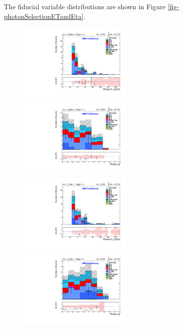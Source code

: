 The fiducial variable distributions are shown in Figure \ref{fig-photonSelectionETandEta}.

\begin{figure}
\includegraphics[width=0.5\textwidth]{Plots/ControlPlots/TTbarPhotonAnalysis/MuMu/Photons/SignalPhotons/Photon_ET_splitTTbar_ratio.pdf}
\includegraphics[width=0.5\textwidth]{Plots/ControlPlots/TTbarPhotonAnalysis/MuMu/Photons/SignalPhotons/Photon_AbsEta_splitTTbar_ratio.pdf} \\
\includegraphics[width=0.5\textwidth]{Plots/ControlPlots/TTbarPhotonAnalysis/EE/Photons/SignalPhotons/Photon_ET_splitTTbar_ratio.pdf}
\includegraphics[width=0.5\textwidth]{Plots/ControlPlots/TTbarPhotonAnalysis/EE/Photons/SignalPhotons/Photon_AbsEta_splitTTbar_ratio.pdf} \\

\end{figure}

